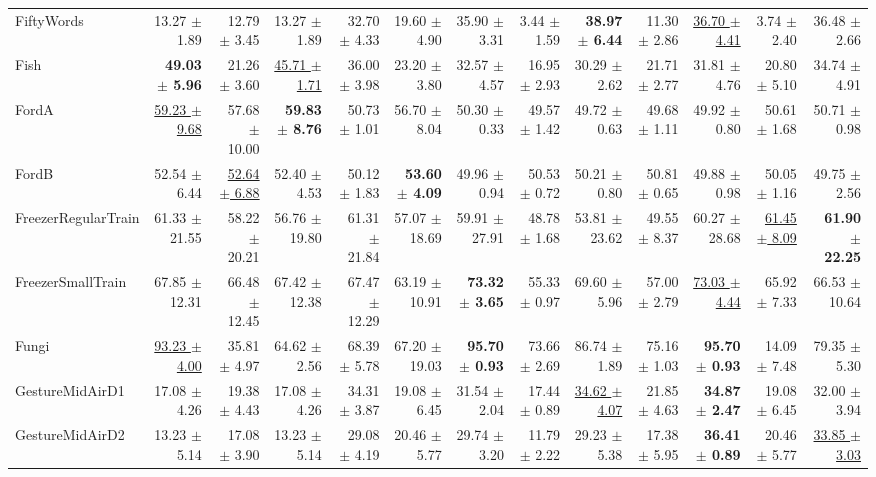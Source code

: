 \begin{landscape}
\begin{longtable}{lrrrrrrrrrrrr}
FiftyWords & 13.27 $\pm$ 1.89 & 12.79 $\pm$ 3.45 & 13.27 $\pm$ 1.89 & 32.70 $\pm$ 4.33 & 19.60 $\pm$ 4.90 & 35.90 $\pm$ 3.31 & 3.44 $\pm$ 1.59 & \textbf{38.97 $\pm$ 6.44} & 11.30 $\pm$ 2.86 & \underline{36.70 $\pm$ 4.41} & 3.74 $\pm$ 2.40 & 36.48 $\pm$ 2.66 \\
Fish & \textbf{49.03 $\pm$ 5.96} & 21.26 $\pm$ 3.60 & \underline{45.71 $\pm$ 1.71} & 36.00 $\pm$ 3.98 & 23.20 $\pm$ 3.80 & 32.57 $\pm$ 4.57 & 16.95 $\pm$ 2.93 & 30.29 $\pm$ 2.62 & 21.71 $\pm$ 2.77 & 31.81 $\pm$ 4.76 & 20.80 $\pm$ 5.10 & 34.74 $\pm$ 4.91 \\
FordA & \underline{59.23 $\pm$ 9.68} & 57.68 $\pm$ 10.00 & \textbf{59.83 $\pm$ 8.76} & 50.73 $\pm$ 1.01 & 56.70 $\pm$ 8.04 & 50.30 $\pm$ 0.33 & 49.57 $\pm$ 1.42 & 49.72 $\pm$ 0.63 & 49.68 $\pm$ 1.11 & 49.92 $\pm$ 0.80 & 50.61 $\pm$ 1.68 & 50.71 $\pm$ 0.98 \\
FordB & 52.54 $\pm$ 6.44 & \underline{52.64 $\pm$ 6.88} & 52.40 $\pm$ 4.53 & 50.12 $\pm$ 1.83 & \textbf{53.60 $\pm$ 4.09} & 49.96 $\pm$ 0.94 & 50.53 $\pm$ 0.72 & 50.21 $\pm$ 0.80 & 50.81 $\pm$ 0.65 & 49.88 $\pm$ 0.98 & 50.05 $\pm$ 1.16 & 49.75 $\pm$ 2.56 \\
FreezerRegularTrain & 61.33 $\pm$ 21.55 & 58.22 $\pm$ 20.21 & 56.76 $\pm$ 19.80 & 61.31 $\pm$ 21.84 & 57.07 $\pm$ 18.69 & 59.91 $\pm$ 27.91 & 48.78 $\pm$ 1.68 & 53.81 $\pm$ 23.62 & 49.55 $\pm$ 8.37 & 60.27 $\pm$ 28.68 & \underline{61.45 $\pm$ 8.09} & \textbf{61.90 $\pm$ 22.25} \\
FreezerSmallTrain & 67.85 $\pm$ 12.31 & 66.48 $\pm$ 12.45 & 67.42 $\pm$ 12.38 & 67.47 $\pm$ 12.29 & 63.19 $\pm$ 10.91 & \textbf{73.32 $\pm$ 3.65} & 55.33 $\pm$ 0.97 & 69.60 $\pm$ 5.96 & 57.00 $\pm$ 2.79 & \underline{73.03 $\pm$ 4.44} & 65.92 $\pm$ 7.33 & 66.53 $\pm$ 10.64 \\
Fungi & \underline{93.23 $\pm$ 4.00} & 35.81 $\pm$ 4.97 & 64.62 $\pm$ 2.56 & 68.39 $\pm$ 5.78 & 67.20 $\pm$ 19.03 & \textbf{95.70 $\pm$ 0.93} & 73.66 $\pm$ 2.69 & 86.74 $\pm$ 1.89 & 75.16 $\pm$ 1.03 & \textbf{95.70 $\pm$ 0.93} & 14.09 $\pm$ 7.48 & 79.35 $\pm$ 5.30 \\
GestureMidAirD1 & 17.08 $\pm$ 4.26 & 19.38 $\pm$ 4.43 & 17.08 $\pm$ 4.26 & 34.31 $\pm$ 3.87 & 19.08 $\pm$ 6.45 & 31.54 $\pm$ 2.04 & 17.44 $\pm$ 0.89 & \underline{34.62 $\pm$ 4.07} & 21.85 $\pm$ 4.63 & \textbf{34.87 $\pm$ 2.47} & 19.08 $\pm$ 6.45 & 32.00 $\pm$ 3.94 \\
GestureMidAirD2 & 13.23 $\pm$ 5.14 & 17.08 $\pm$ 3.90 & 13.23 $\pm$ 5.14 & 29.08 $\pm$ 4.19 & 20.46 $\pm$ 5.77 & 29.74 $\pm$ 3.20 & 11.79 $\pm$ 2.22 & 29.23 $\pm$ 5.38 & 17.38 $\pm$ 5.95 & \textbf{36.41 $\pm$ 0.89} & 20.46 $\pm$ 5.77 & \underline{33.85 $\pm$ 3.03} \\

\end{longtable}
\end{landscape}

